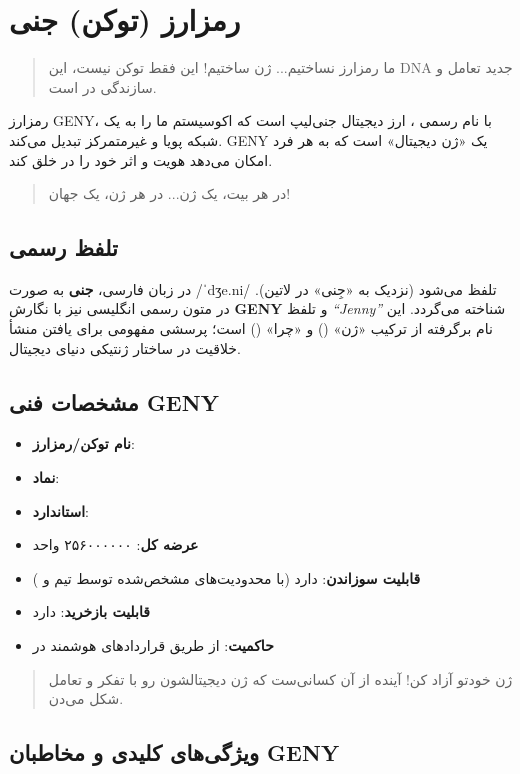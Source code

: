 \documentclass[a4paper,12pt,openany]{book}
\begin{document}
\chapter{رمزارز (توکن) جنی}
\begin{quote}
ما رمزارز نساختیم... ژن ساختیم! این فقط توکن نیست، این DNA جدید تعامل و سازندگی در  است.
\end{quote}
رمزارز GENY، با نام رسمی ، ارز دیجیتال جنی‌لیپ است که اکوسیستم ما را به یک شبکه پویا و غیرمتمرکز تبدیل می‌کند. GENY یک «ژن دیجیتال» است که به هر فرد امکان می‌دهد هویت و اثر خود را در  خلق کند.
\begin{quote}
در هر بیت، یک ژن... در هر ژن، یک جهان!
\end{quote}

\section*{تلفظ رسمی}
در زبان فارسی، \textbf{جنی} به صورت {\ipafont /ˈdʒe.ni/} تلفظ می‌شود (نزدیک به «جِنی» در لاتین). در متون رسمی انگلیسی نیز با نگارش \textbf{GENY} و تلفظ \textit{``Jenny''} شناخته می‌گردد. این نام برگرفته از ترکیب «ژن» () و «چرا» () است؛ پرسشی مفهومی برای یافتن منشأ خلاقیت در ساختار ژنتیکی دنیای دیجیتال.

\section*{مشخصات فنی GENY}
\begin{itemize}
    \item \textbf{نام توکن/رمزارز}: 
    \item \textbf{نماد}: 
    \item \textbf{استاندارد}: 
    \item \textbf{عرضه کل}: ۲۵۶۰۰۰۰۰۰ واحد
    \item \textbf{قابلیت سوزاندن}: دارد (با محدودیت‌های مشخص‌شده توسط تیم و )
    \item \textbf{قابلیت بازخرید}: دارد
    \item \textbf{حاکمیت}: از طریق قراردادهای هوشمند  در 
\end{itemize}
\vspace{-0.5em}
\begin{quote}
ژن خودتو آزاد کن! آینده از آن کسانی‌ست که ژن دیجیتالشون رو با تفکر و تعامل شکل می‌دن.
\end{quote}
\newpage

\section*{ویژگی‌های کلیدی و مخاطبان GENY}
\end{document}
